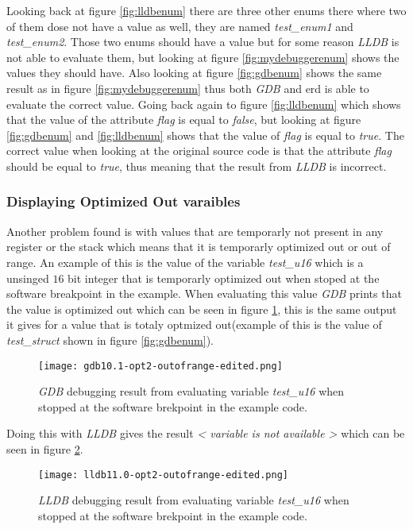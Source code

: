 Looking back at figure \ref{fig:lldbenum} there are three other enums there where two of them dose not have a value as well, they are named \emph{test\_enum1} and \emph{test\_enum2}.
Those two enums should have a value but for some reason \emph{LLDB} is not able to evaluate them, but looking at figure \ref{fig:mydebuggerenum} shows the values they should have.
Also looking at figure \ref{fig:gdbenum} shows the same result as in figure \ref{fig:mydebuggerenum} thus both \emph{GDB} and \gls{erd} is able to evaluate the correct value.
Going back again to figure \ref{fig:lldbenum} which shows that the value of the attribute \emph{flag} is equal to \emph{false}, but looking at figure \ref{fig:gdbenum} and \ref{fig:lldbenum} shows that the value of \emph{flag} is equal to \emph{true}.
The correct value when looking at the original source code is that the attribute \emph{flag} should be equal to \emph{true}, thus meaning that the result from \emph{LLDB} is incorrect.



\subsubsection{Displaying Optimized Out varaibles}
Another problem found is with values that are temporarly not present in any register or the stack which means that it is temporarly optimized out or out of range.
An example of this is the value of the variable \emph{test\_u16} which is a unsinged $16$ bit integer that is temporarly optimized out when stoped at the software breakpoint in the example.
When evaluating this value \emph{GDB} prints that the value is optimized out which can be seen in figure \ref{fig:gdboutofrange}, this is the same output it gives for a value that is totaly optmized out(example of this is the value of \emph{test\_struct} shown in figure \ref{fig:gdbenum}).


\begin{figure}[h]
	\centering
	\texttt{[image: gdb10.1-opt2-outofrange-edited.png]}
	\caption{\emph{GDB} debugging result from evaluating variable \emph{test\_u16} when stopped at the software brekpoint in the example code.}
    	\label{fig:gdboutofrange}
\end{figure}


Doing this with \emph{LLDB} gives the result  \emph{< variable is not available >} which can be seen in figure \ref{fig:lldboutofrange}.


\begin{figure}[h]
	\centering
	\texttt{[image: lldb11.0-opt2-outofrange-edited.png]}
	\caption{\emph{LLDB} debugging result from evaluating variable \emph{test\_u16} when stopped at the software brekpoint in the example code.}
	\label{fig:lldboutofrange}
\end{figure}


